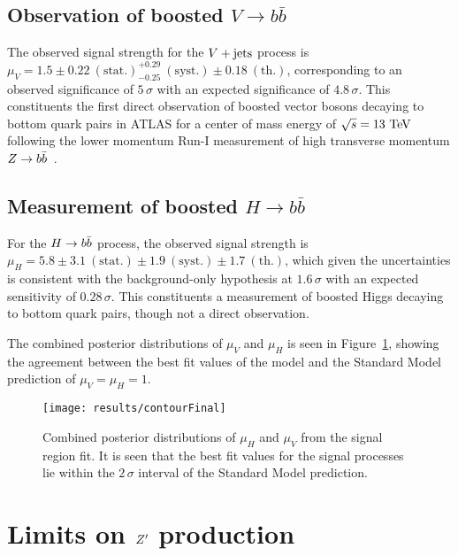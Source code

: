 \subsection{Observation of boosted $V\to b\bar{b}$}

The observed signal strength for the $V + \text{jets}$ process is\\ $\mu_{V} = 1.5 \pm 0.22~\mathrm{(stat.)}^{+0.29}_{-0.25}~\mathrm{(syst.)} \pm 0.18~\mathrm{(th.)}$, corresponding to an observed significance of $5\,\sigma$ with an expected significance of $4.8\,\sigma$.
This constituents the first direct observation of boosted vector bosons decaying to bottom quark pairs in ATLAS for a center of mass energy of $\sqrt{s}=13~\mathrm{TeV}$ following the lower momentum Run-I measurement of high transverse momentum $Z \to b\bar{b}$~\cite{STDM-2013-04}.

\subsection{Measurement of boosted $H\to b\bar{b}$}
For the $H \to b\bar{b}$ process, the observed signal strength is\\ $\mu_{H} = 5.8 \pm 3.1~\mathrm{(stat.)} \pm 1.9~\mathrm{(syst.)} \pm 1.7~\mathrm{(th.)}$, which given the uncertainties is consistent with the background-only hypothesis at $1.6\,\sigma$ with an expected sensitivity of $0.28\,\sigma$.
This constituents a measurement of boosted Higgs decaying to bottom quark pairs, though not a direct observation.

The combined posterior distributions of $\mu_{V}$ and $\mu_{H}$ is seen in Figure~\ref{fig:signal_strength_contour}, showing the agreement between the best fit values of the model and the Standard Model prediction of $\mu_{V} = \mu_{H} = 1$.

\begin{figure}[htbp]
 \centering
 \texttt{[image: results/contourFinal]}
 \caption{Combined posterior distributions of $\mu_{H}$ and $\mu_{V}$ from the signal region fit.
  It is seen that the best fit values for the signal processes lie within the $2\,\sigma$ interval of the Standard Model prediction.}
 \label{fig:signal_strength_contour}
\end{figure}

\section{Limits on $Z'$ production}

